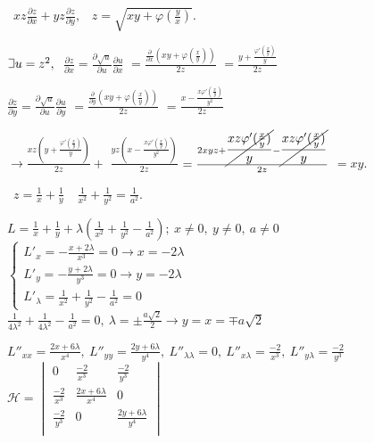 \documentclass{report}
\def\letus{%
    \mathord{\setbox0=\hbox{$\exists$}%
             \hbox{\kern 0.125\wd0%
                   \vbox to \ht0{%
                      \hrule width 0.75\wd0%
                      \vfill%
                      \hrule width 0.75\wd0}%
                   \vrule height \ht0%
                   \kern 0.125\wd0}%
           }%
}
\begin{document}

\
$ xz \frac{\partial z}{\partial x} 
+ yz\frac{\partial z}{\partial y}, $
\ 
$ z = \sqrt{xy + \varphi(\frac{y}{x})} .$

$ \letus u = z^2,\ $
$ \frac{\partial z}{\partial x} =
\frac{\partial \sqrt{u}}{\partial u} \frac{\partial u}{\partial x} $
$ = \frac{\frac{\displaystyle \partial}{\displaystyle \partial x}
(xy + \varphi(\frac{x}{y})) }{2z} $
$ = \frac{y + \displaystyle \frac{\varphi'(\frac{x}{y})}{y}}{2z} $

$ \frac{\partial z}{\partial y} = 
\frac{\partial \sqrt{u}}{\partial u} \frac{\partial u}{\partial y} $
$ = \frac{\frac{\displaystyle \partial}{\displaystyle \partial y}
(xy + \varphi(\frac{x}{y})) }{2z} $
$ = \frac{x - \displaystyle \frac{x \varphi'(\frac{x}{y})}{y^2}}{2z} $

$ \rightarrow \frac{xz(y + \displaystyle \frac{\varphi'(\frac{x}{y})}{y})}{2z} + $
$ \frac{yz(x - \displaystyle \frac{x \varphi'(\frac{x}{y})}{y^2})}{2z} $
$ = \frac{2xyz + \cancel{\displaystyle \frac{xz \varphi'(\frac{x}{y})}{y}}
- \cancel{\displaystyle \frac{xz \varphi'(\frac{x}{y})}{y}}
} {2z} $
$ = xy.$

\
$ z = \frac{1}{x} + \frac{1}{y}\ $ \
$ \frac{1}{x^2} + \frac{1}{y^2} = \frac{1}{a^2}. $

$ L = \frac{1}{x} + \frac{1}{y} + \lambda(\frac{1}{x^2} + \frac{1}{y^2}
- \frac{1}{a^2});\ x \neq 0,\ y \neq 0,\ a \neq 0 $\\
\indent
$ \begin{cases}
    L'_x = -\frac{x + 2\lambda}{x^3} = 0 \rightarrow x = -2\lambda\\
    L'_y = -\frac{y + 2\lambda}{y^3} = 0 \rightarrow y = -2\lambda\\
    L'_{\lambda} = \frac{1}{x^2} + \frac{1}{y^2} - \frac{1}{a^2} = 0
\end{cases} $\\
\indent
$ \frac{1}{4\lambda^2} + \frac{1}{4\lambda^2} - \frac{1}{a^2} = 0,\
\lambda = \pm \frac{a \sqrt{2}}{2} \rightarrow y = x = \mp a\sqrt{2} $

$ L''_{xx}  = \frac{2x + 6\lambda}{x^4},\ L''_{yy} = \frac{2y + 6\lambda}{y^4},\
L''_{\lambda \lambda} = 0,\ L''_{x \lambda} = \frac{-2}{x^3},\ L''_{y \lambda}
= \frac{-2}{y^3} $\\
\indent
$ \mathcal{H} = \begin{vmatrix}
    0 & \frac{-2}{x^3} & \frac{-2}{y^3}\\
    \frac{-2}{x^3} & \frac{2x + 6\lambda}{x^4} & 0 \\
    \frac{-2}{y^3} & 0 & \frac{2y + 6\lambda}{y^4}\\
\end{vmatrix} $\\
\end{document}
